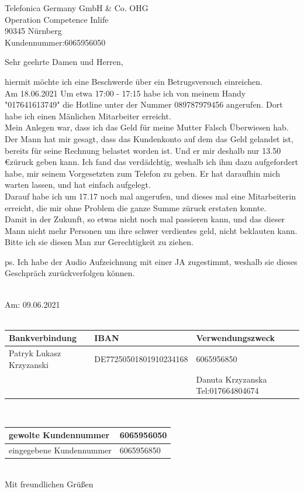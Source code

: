 \documentclass{letter} %
\begin{document}
\begin{letter}{Telefonica Germany GmbH & Co. OHG \\ Operation Competence Inlife \\ 90345 N\"urnberg \\ Kundennummer:6065956050}
\opening{Sehr geehrte Damen und Herren, }
	hiermit m\"ochte ich eine Beschwerde \"uber ein Betrugsversuch einreichen.\\
	Am 18.06.2021 Um etwa 17:00 - 17:15 habe ich von meinem Handy "017641613749"  die Hotline unter der Nummer 089787979456 angerufen. Dort habe ich einen M\"anlichen Mitarbeiter erreicht.\\
	Mein Anlegen war, dass ich das Geld f\"ur meine Mutter Falsch \"Uberwiesen hab.
	Der Mann hat mir gesagt, dass das Kundenkonto auf dem das Geld gelandet ist, bereits f\"ur seine Rechnung belastet worden ist.  
	Und er mir deshalb nur 13.50 \euro z\"uruck geben kann. Ich fand das verd\"adchtig, weshalb ich ihm dazu aufgefordert habe, mir seinem Vorgesetzten zum Telefon zu geben. Er hat daraufhin mich warten lassen, und hat einfach aufgelegt. \\ Darauf habe ich um 17.17 noch mal angerufen, und dieses mal eine Mitarbeiterin erreicht, die mir ohne Problem die ganze Summe z\"uruck erstaten konnte.
	\\
	Damit in der Zukunft, so etwas nicht noch mal passieren kann, und das dieser Mann nicht mehr Personen um ihre schwer verdientes geld, nicht beklauten kann. Bitte ich sie diesen Man zur Gerechtigkeit zu ziehen. 

	ps. Ich habe der Audio Aufzeichnung mit einer JA zugestimmt, weshalb sie dieses Geschpr\"ach zur\"uckverfolgen k\"onnen. 

\\
		Am: 09.06.2021\\
		\\
		\vspace{10px}
		\begin{tabular}{|m|m|m|}
			\hline
			Bankverbindung& IBAN & Verwendungszweck\\\hline
			Patryk Lukasz Krzyzanski& DE77250501801910234168& 6065956850 \\
			& & Danuta Krzyzanska Tel:017664804674 \\\hline
		\end{tabular}\\
		\begin{tabular}{ |m|m|}
			\hline
			gewolte Kundennummer&6065956050 \\\hline
			eingegebene Kundennummer& 6065956850\\\hline
		\end{tabular}
		\vspace{10px}
		\\
Mit freundlichen Gr\"u\ss en


\end{letter}
\end{document}
